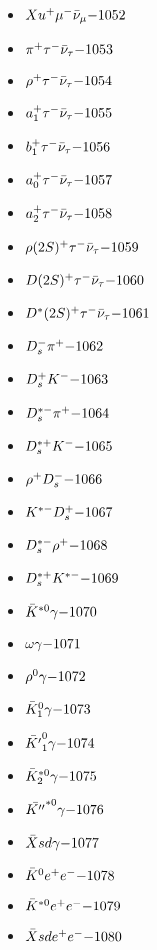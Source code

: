 \begin{multicols}{3}
\begin{itemize}
 \item $ Xu^{+} \mu^{-} \bar{\nu}_{\mu} \hfill{-1052}$
 \item $ \pi^{+} \tau^{-} \bar{\nu}_{\tau} \hfill{-1053}$
 \item $ \rho^{+} \tau^{-} \bar{\nu}_{\tau} \hfill{-1054}$
 \item $ a_{1}^{+} \tau^{-} \bar{\nu}_{\tau} \hfill{-1055}$
 \item $ b_{1}^{+} \tau^{-} \bar{\nu}_{\tau} \hfill{-1056}$
 \item $ a_{0}^{+} \tau^{-} \bar{\nu}_{\tau} \hfill{-1057}$
 \item $ a_{2}^{+} \tau^{-} \bar{\nu}_{\tau} \hfill{-1058}$
 \item $ \rho(2S)^{+} \tau^{-} \bar{\nu}_{\tau} \hfill{-1059}$
 \item $ D(2S)^{+} \tau^{-} \bar{\nu}_{\tau} \hfill{-1060}$
 \item $ D^{*}(2S)^{+} \tau^{-} \bar{\nu}_{\tau} \hfill{-1061}$
 \item $ D_{s}^{-} \pi^{+} \hfill{-1062}$
 \item $ D_{s}^{+} K^{-} \hfill{-1063}$
 \item $ D_{s}^{*-} \pi^{+} \hfill{-1064}$
 \item $ D_{s}^{*+} K^{-} \hfill{-1065}$
 \item $ \rho^{+} D_{s}^{-} \hfill{-1066}$
 \item $ K^{*-} D_{s}^{+} \hfill{-1067}$
 \item $ D_{s}^{*-} \rho^{+} \hfill{-1068}$
 \item $ D_{s}^{*+} K^{*-} \hfill{-1069}$
 \item $ \bar{K}^{*0} \gamma \hfill{-1070}$
 \item $ \omega \gamma \hfill{-1071}$
 \item $ \rho^{0} \gamma \hfill{-1072}$
 \item $ \bar{K}_{1}^{0} \gamma \hfill{-1073}$
 \item $ \bar{{K^{\prime}}}_{1}^{0} \gamma \hfill{-1074}$
 \item $ \bar{K}_{2}^{*0} \gamma \hfill{-1075}$
 \item $ \bar{{K^{\prime\prime}}}^{*0} \gamma \hfill{-1076}$
 \item $ \bar{X}sd \gamma \hfill{-1077}$
 \item $ \bar{K}^{0} e^{+} e^{-} \hfill{-1078}$
 \item $ \bar{K}^{*0} e^{+} e^{-} \hfill{-1079}$
 \item $ \bar{X}sd e^{+} e^{-} \hfill{-1080}$

\end{itemize}
\end{multicols}
